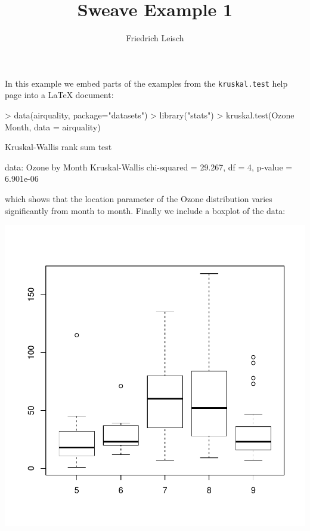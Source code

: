 \documentclass[a4paper]{article}
\title{Sweave Example 1}
\author{Friedrich Leisch}
\begin{document}
\maketitle

In this example we embed parts of the examples from the
\texttt{kruskal.test} help page into a \LaTeX{} document:

\begin{Schunk}
\begin{Sinput}
> data(airquality, package="datasets")
> library("stats")
> kruskal.test(Ozone ~ Month, data = airquality)
\end{Sinput}
\begin{Soutput}
	Kruskal-Wallis rank sum test

data:  Ozone by Month
Kruskal-Wallis chi-squared = 29.267, df = 4, p-value = 6.901e-06
\end{Soutput}
\end{Schunk}
which shows that the location parameter of the Ozone 
distribution varies significantly from month to month. Finally we
include a boxplot of the data:

\begin{center}
\includegraphics{example-1-002}
\end{center}
\end{document}
